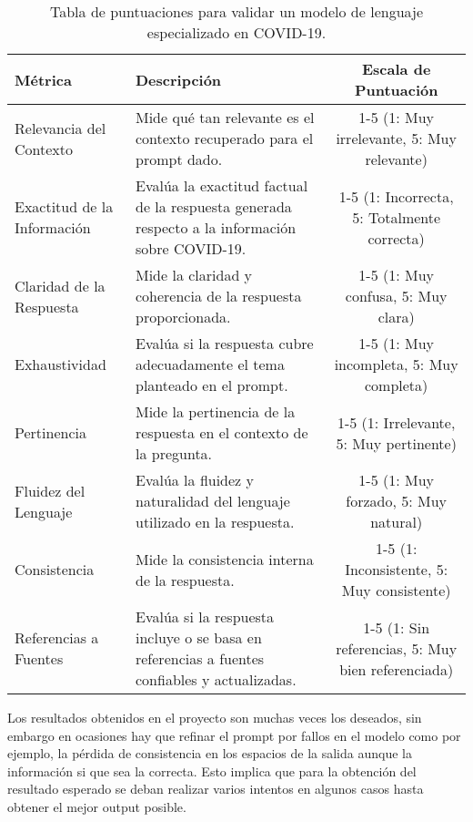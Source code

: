 \begin{table}[h]
    \centering
   \hspace*{-2.5cm}\begin{tabular}{|l|p{3cm}|c|}
        \hline
        \textbf{Métrica} & \textbf{Descripción} & \textbf{Escala de Puntuación} \\
        \hline
        Relevancia del Contexto & Mide qué tan relevante es el contexto recuperado para el prompt dado. & 1-5 (1: Muy irrelevante, 5: Muy relevante) \\
        \hline
        Exactitud de la Información & Evalúa la exactitud factual de la respuesta generada respecto a la información sobre COVID-19. & 1-5 (1: Incorrecta, 5: Totalmente correcta) \\
        \hline
        Claridad de la Respuesta & Mide la claridad y coherencia de la respuesta proporcionada. & 1-5 (1: Muy confusa, 5: Muy clara) \\
        \hline
        Exhaustividad & Evalúa si la respuesta cubre adecuadamente el tema planteado en el prompt. & 1-5 (1: Muy incompleta, 5: Muy completa) \\
        \hline
        Pertinencia & Mide la pertinencia de la respuesta en el contexto de la pregunta. & 1-5 (1: Irrelevante, 5: Muy pertinente) \\
        \hline
        Fluidez del Lenguaje & Evalúa la fluidez y naturalidad del lenguaje utilizado en la respuesta. & 1-5 (1: Muy forzado, 5: Muy natural) \\
        \hline
        Consistencia & Mide la consistencia interna de la respuesta. & 1-5 (1: Inconsistente, 5: Muy consistente) \\
        \hline
        Referencias a Fuentes & Evalúa si la respuesta incluye o se basa en referencias a fuentes confiables y actualizadas. & 1-5 (1: Sin referencias, 5: Muy bien referenciada) \\
        \hline
    \end{tabular}
    \caption{Tabla de puntuaciones para validar un modelo de lenguaje especializado en COVID-19.}
    \label{tab:validation_scores}
\end{table}


Los resultados obtenidos en el proyecto son muchas veces los deseados, sin embargo en ocasiones hay que refinar el prompt por fallos en el modelo como por ejemplo, la pérdida de consistencia en los espacios de la salida aunque la información si que sea la correcta. Esto implica que para la obtención del resultado esperado se deban realizar varios intentos en algunos casos hasta obtener el mejor output posible. 

